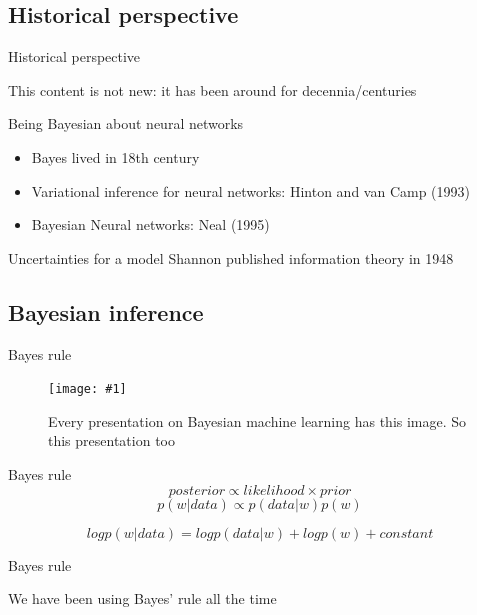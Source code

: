 \documentclass{beamer}
\newcommand{\fitfigure}[1]{\centering\texttt{[image: \#1]}}
\begin{document}
\subsection{Historical perspective}
\begin{frame}{Historical perspective}
	\centerline{This content is not new: it has been around for decennia/centuries}
	\centerline{  }
	
	\begin{block}{Being Bayesian about neural networks}
		\begin{itemize}
			\item Bayes lived in 18th century
			\item Variational inference for neural networks: Hinton and van Camp (1993)
			\item Bayesian Neural networks: Neal (1995)
		\end{itemize}
	\end{block}
	
	\begin{block}{Uncertainties for a model}
		Shannon published information theory in 1948
	\end{block}
	
\end{frame}

\subsection{Bayesian inference}
\begin{frame}{Bayes rule}
	\begin{figure}
		\fitfigure{im/bayes_neon.jpg}
		\caption{Every presentation on Bayesian machine learning has this image. So this presentation too}
	\end{figure}
\end{frame}

\begin{frame}{Bayes rule}
	\begin{equation*}
		posterior \propto likelihood \times prior
	\end{equation*}
	\begin{equation*}
		p(w|data) \propto p(data|w)p(w)
	\end{equation*}
	\centerline{  }
	\begin{equation*}
		log p(w|data) =  log p(data|w) + log p(w) + constant
	\end{equation*}
\end{frame}

\begin{frame}{Bayes rule}
	\centerline{We have been using Bayes' rule all the time}
\end{frame}
\end{document}
